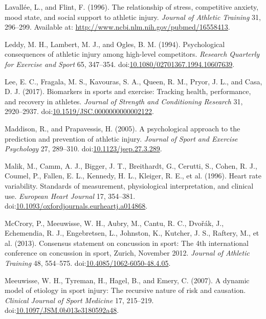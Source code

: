 \documentclass[utf8]{frontiersHLTH}
\begin{document}
\leavevmode\hypertarget{ref-Lavallee1996}{}%
Lavallée, L., and Flint, F. (1996). The relationship of stress,
competitive anxiety, mood state, and social support to athletic injury.
\emph{Journal of Athletic Training} 31, 296--299. Available at:
\url{http://www.ncbi.nlm.nih.gov/pubmed/16558413}.

\leavevmode\hypertarget{ref-Leddy1994}{}%
Leddy, M. H., Lambert, M. J., and Ogles, B. M. (1994). Psychological
consequences of athletic injury among high-level competitors.
\emph{Research Quarterly for Exercise and Sport} 65, 347--354.
doi:\href{https://doi.org/10.1080/02701367.1994.10607639}{10.1080/02701367.1994.10607639}.

\leavevmode\hypertarget{ref-Lee2017}{}%
Lee, E. C., Fragala, M. S., Kavouras, S. A., Queen, R. M., Pryor, J. L.,
and Casa, D. J. (2017). Biomarkers in sports and exercise: Tracking
health, performance, and recovery in athletes. \emph{Journal of Strength
and Conditioning Research} 31, 2920--2937.
doi:\href{https://doi.org/10.1519/JSC.0000000000002122}{10.1519/JSC.0000000000002122}.

\leavevmode\hypertarget{ref-Maddison2005}{}%
Maddison, R., and Prapavessis, H. (2005). A psychological approach to
the prediction and prevention of athletic injury. \emph{Journal of Sport
and Exercise Psychology} 27, 289--310.
doi:\href{https://doi.org/10.1123/jsep.27.3.289}{10.1123/jsep.27.3.289}.

\leavevmode\hypertarget{ref-Malik1996}{}%
Malik, M., Camm, A. J., Bigger, J. T., Breithardt, G., Cerutti, S.,
Cohen, R. J., Coumel, P., Fallen, E. L., Kennedy, H. L., Kleiger, R. E.,
et al. (1996). Heart rate variability. Standards of measurement,
physiological interpretation, and clinical use. \emph{European Heart
Journal} 17, 354--381.
doi:\href{https://doi.org/10.1093/oxfordjournals.eurheartj.a014868}{10.1093/oxfordjournals.eurheartj.a014868}.

\leavevmode\hypertarget{ref-McCrory2013}{}%
McCrory, P., Meeuwisse, W. H., Aubry, M., Cantu, R. C., Dvořák, J.,
Echemendia, R. J., Engebretsen, L., Johnston, K., Kutcher, J. S.,
Raftery, M., et al. (2013). Consensus statement on concussion in sport:
The 4th international conference on concussion in sport, Zurich,
November 2012. \emph{Journal of Athletic Training} 48, 554--575.
doi:\href{https://doi.org/10.4085/1062-6050-48.4.05}{10.4085/1062-6050-48.4.05}.

\leavevmode\hypertarget{ref-Meeuwisse2007}{}%
Meeuwisse, W. H., Tyreman, H., Hagel, B., and Emery, C. (2007). A
dynamic model of etiology in sport injury: The recursive nature of risk
and causation. \emph{Clinical Journal of Sport Medicine} 17, 215--219.
doi:\href{https://doi.org/10.1097/JSM.0b013e3180592a48}{10.1097/JSM.0b013e3180592a48}.
\end{document}
